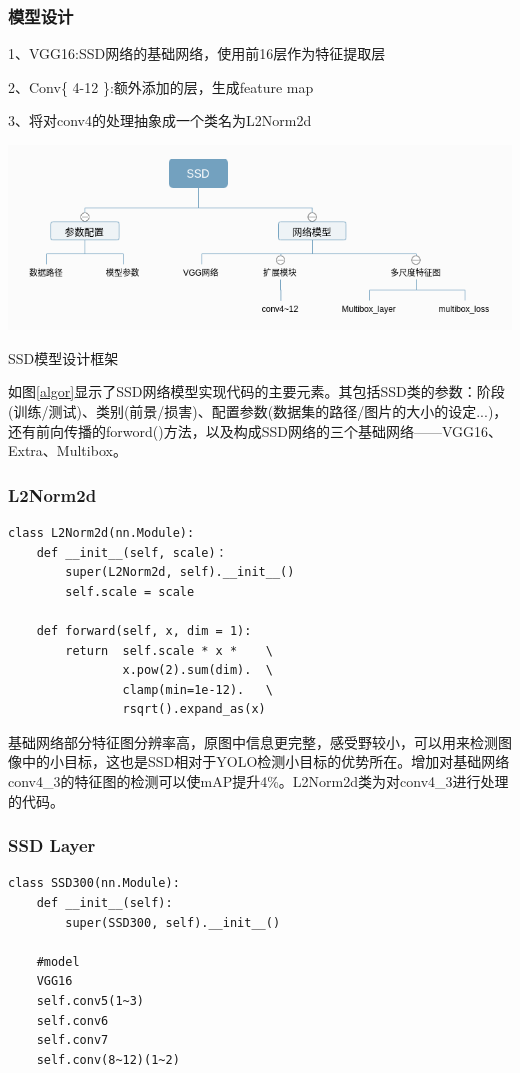 \subsubsection{模型设计}
1、VGG16:SSD网络的基础网络，使用前16层作为特征提取层

2、Conv\{ 4-12 \}:额外添加的层，生成feature map

3、将对conv4的处理抽象成一个类名为L2Norm2d
\begin{uscfigure}
	\includegraphics[width=\textwidth]{./Pictures/SSD.png}	
	\caption{SSD模型设计框架}
	\label{algor}
\end{uscfigure}
如图\ref{algor}显示了SSD网络模型实现代码的主要元素。其包括SSD类的参数：阶段(训练/测试)、类别(前景/损害)、配置参数(数据集的路径/图片的大小的设定...)，还有前向传播的forword()方法，以及构成SSD网络的三个基础网络——VGG16、Extra、Multibox。
\subsubsection{L2Norm2d}
\begin{lstlisting}[caption={L2Norm2d}]
class L2Norm2d(nn.Module):
	def __init__(self, scale)：
		super(L2Norm2d, self).__init__()
		self.scale = scale
		
	def forward(self, x, dim = 1):
		return  self.scale * x *    \
				x.pow(2).sum(dim).  \
				clamp(min=1e-12).	\
				rsqrt().expand_as(x)
\end{lstlisting}

基础网络部分特征图分辨率高，原图中信息更完整，感受野较小，可以用来检测图像中的小目标，这也是SSD相对于YOLO检测小目标的优势所在。增加对基础网络conv4\_3的特征图的检测可以使mAP提升4\%。L2Norm2d类为对conv4\_3进行处理的代码。
\subsubsection{SSD Layer}
\begin{lstlisting}[caption={SSD layer}]
class SSD300(nn.Module):
	def __init__(self):
		super(SSD300, self).__init__()
	
	#model
	VGG16
	self.conv5(1~3)
	self.conv6
	self.conv7
	self.conv(8~12)(1~2)
\end{lstlisting}

